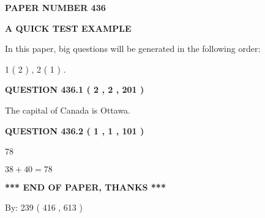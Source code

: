 \documentclass[12pt]{article}
\begin{document}
   
 {\textbf{ \Large{ PAPER NUMBER  436  }}}
   
   
\vspace{0.2in}
   
   
   
   
   
   
 \vspace{0.2in}
{\LARGE {\textbf{ A QUICK TEST EXAMPLE}}}
   
   
   
\vspace{0.2in}
   
In this paper, big questions will be generated in the following order: 
   
   
   1 ( 2 )
 ,
   2 ( 1 )
 .
  
\vspace{0.2in}
  
{\textbf{\Large{QUESTION
436.1 
 ( 2 , 2 , 201 )
}}}
  
  
 
 
\noindent{}
 
 
The capital of Canada is Ottawa.
 
 
 
 
  
\vspace{0.2in}
  
{\textbf{\Large{QUESTION
436.2 
 ( 1 , 1 , 101 )
}}}
  
  
 
 
\noindent{}

78
 
 
 
 
\noindent{}

$ %
38 +  %
40=   %
78$
 
 
   
   
 \vspace{0.2in}
 
   
   
   
   
\vspace{1.0in} 
{\textbf{\large{ *** END OF PAPER, THANKS *** }}} 
   
   
\hspace{1.0in} By: 
 239 ( 416 ,  613 )
   
\end{document}
